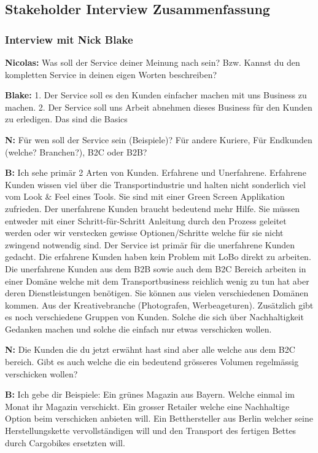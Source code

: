 \subsection{Stakeholder Interview Zusammenfassung}
\label{subsec:interviewzusammen}
\subsubsection{Interview mit Nick Blake}

\textbf{Nicolas:} Was soll der Service deiner Meinung nach sein? Bzw. Kannst du den kompletten Service in deinen eigen Worten beschreiben?

\textbf{Blake:} 1. Der Service soll es den Kunden einfacher machen mit uns Business zu machen. 2. Der Service soll uns Arbeit abnehmen dieses Business für den Kunden zu erledigen. Das sind die Basics

\textbf{N:} Für wen soll der Service sein (Beispiele)?
  Für andere Kuriere, Für Endkunden (welche? Branchen?), B2C oder B2B?

\textbf{B:} Ich sehe primär 2 Arten von Kunden. Erfahrene und Unerfahrene. Erfahrene Kunden wissen viel über die Transportindustrie und halten nicht sonderlich viel vom Look \& Feel eines Tools. Sie sind mit einer Green Screen Applikation zufrieden. Der unerfahrene Kunden braucht bedeutend mehr Hilfe. Sie müssen entweder mit einer Schritt-für-Schritt Anleitung durch den Prozess geleitet werden oder wir verstecken gewisse Optionen/Schritte welche für sie nicht zwingend notwendig sind. Der Service ist primär für die unerfahrene Kunden gedacht. Die erfahrene Kunden haben kein Problem mit LoBo direkt zu arbeiten. Die unerfahrene Kunden aus dem B2B sowie auch dem B2C Bereich arbeiten in einer Domäne welche mit dem Transportbusiness reichlich wenig zu tun hat aber deren Dienstleistungen benötigen. Sie können aus vielen verschiedenen Domänen kommen. Aus der Kreativebranche (Photografen, Werbeageturen). Zusätzlich gibt es noch verschiedene Gruppen von Kunden. Solche die sich über Nachhaltigkeit Gedanken machen und solche die einfach nur etwas verschicken wollen.

\textbf{N:} Die Kunden die du jetzt erwähnt hast sind aber alle welche aus dem B2C bereich. Gibt es auch welche die ein bedeutend grösseres Volumen regelmässig verschicken wollen?

\textbf{B:} Ich gebe dir Beispiele:
Ein grünes Magazin aus Bayern. Welche einmal im Monat ihr Magazin verschickt. Ein grosser Retailer welche eine Nachhaltige Option beim verschicken anbieten will. Ein Betthersteller aus Berlin welcher seine Herstellungskette vervollständigen will und den Transport des fertigen Bettes durch Cargobikes ersetzten will.

